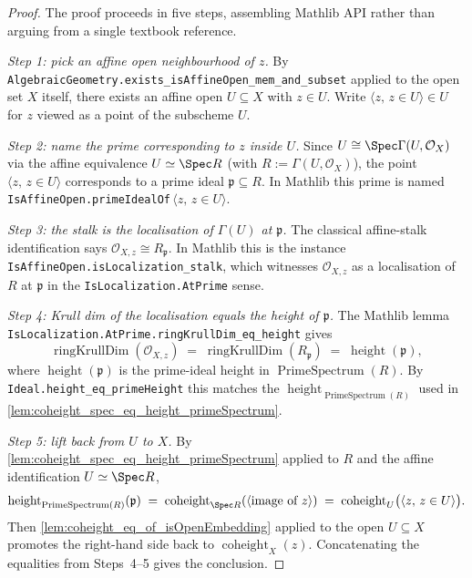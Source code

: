 \begin{proof}

  \leanok
  The proof proceeds in five steps, assembling Mathlib API rather than
  arguing from a single textbook reference.

  \emph{Step 1: pick an affine open neighbourhood of \(z\).} By
  \texttt{AlgebraicGeometry.exists\_isAffineOpen\_mem\_and\_subset}
  applied to the open set \(X\) itself, there exists an affine open
  \(U \subseteq X\) with \(z \in U\). Write \(\langle z, \, z \in U \rangle \in U\)
  for \(z\) viewed as a point of the subscheme \(U\).

  \emph{Step 2: name the prime corresponding to \(z\) inside \(U\).} Since
  \(U \cong \Spec \Gamma(U, \mathcal{O}_X)\) via the affine equivalence
  \(U \simeq \Spec R\) (with \(R := \Gamma(U, \mathcal{O}_X)\)), the point
  \(\langle z, \, z \in U\rangle\) corresponds to a prime ideal \(\mathfrak{p}
  \subseteq R\). In Mathlib this prime is named
  \texttt{IsAffineOpen.primeIdealOf}\,\(\langle z, \, z \in U\rangle\).

  \emph{Step 3: the stalk is the localisation of \(\Gamma(U)\) at
  \(\mathfrak{p}\).} The classical affine-stalk identification says
  \(\mathcal{O}_{X,z} \cong R_{\mathfrak{p}}\). In Mathlib this is the
  instance \texttt{IsAffineOpen.isLocalization\_stalk}, which witnesses
  \(\mathcal{O}_{X,z}\) as a localisation of \(R\) at \(\mathfrak{p}\) in the
  \texttt{IsLocalization.AtPrime} sense.

  \emph{Step 4: Krull dim of the localisation equals the height of
  \(\mathfrak{p}\).} The Mathlib lemma
  \texttt{IsLocalization.AtPrime.ringKrullDim\_eq\_height} gives
  \[
    \operatorname{ringKrullDim}(\mathcal{O}_{X,z}) \;=\;
    \operatorname{ringKrullDim}(R_{\mathfrak{p}}) \;=\;
    \operatorname{height}(\mathfrak{p}),
  \]
  where \(\operatorname{height}(\mathfrak{p})\) is the prime-ideal height in
  \(\operatorname{PrimeSpectrum}(R)\). By
  \texttt{Ideal.height\_eq\_primeHeight} this matches the
  \(\operatorname{height}_{\operatorname{PrimeSpectrum}(R)}\) used in
  \cref{lem:coheight_spec_eq_height_primeSpectrum}.

  \emph{Step 5: lift back from \(U\) to \(X\).} By
  \cref{lem:coheight_spec_eq_height_primeSpectrum} applied to \(R\) and the
  affine identification \(U \simeq \Spec R\),
  \[
    \operatorname{height}_{\operatorname{PrimeSpectrum}(R)}(\mathfrak{p}) \;=\;
    \operatorname{coheight}_{\Spec R}(\langle\text{image of } z\rangle) \;=\;
    \operatorname{coheight}_{U}\bigl(\langle z, \, z \in U\rangle\bigr).
  \]
  Then \cref{lem:coheight_eq_of_isOpenEmbedding} applied to the open
  \(U \subseteq X\) promotes the right-hand side back to
  \(\operatorname{coheight}_{X}(z)\). Concatenating the equalities from
  Steps~4--5 gives the conclusion.
\end{proof}

